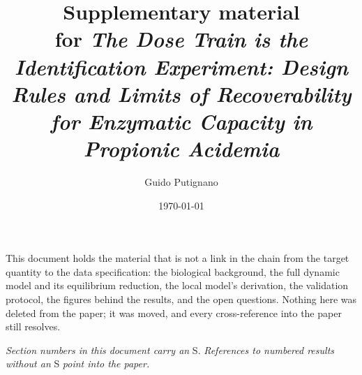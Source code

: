 %

\usepackage{xr}


\renewcommand{\thesection}{S\arabic{section}}
\renewcommand{\thesubsection}{S\arabic{section}.\arabic{subsection}}
\renewcommand{\theequation}{S\arabic{equation}}
\renewcommand{\thefigure}{S\arabic{figure}}
\renewcommand{\thetable}{S\arabic{table}}

\title{\textbf{Supplementary material}\\[0.3em]
\large for \emph{The Dose Train is the Identification Experiment:
Design Rules and Limits of Recoverability for Enzymatic Capacity
in Propionic Acidemia}}
\author{Guido Putignano}
\date{\today}


\maketitle

\noindent
This document holds the material that is not a link in the chain from the target
quantity to the data specification: the biological background, the full dynamic model
and its equilibrium reduction, the local model's derivation, the validation protocol,
the figures behind the results, and the open questions. Nothing here was deleted from
the paper; it was moved, and every cross-reference into the paper still resolves.

\emph{Section numbers in this document carry an} S. \emph{References to numbered results
without an} S \emph{point into the paper.}

\makeatletter
\renewcommand*\l@subsection{\@dottedtocline{2}{1.5em}{3.6em}}
\renewcommand*\l@subsubsection{\@dottedtocline{3}{5.1em}{4.8em}}
\makeatother

